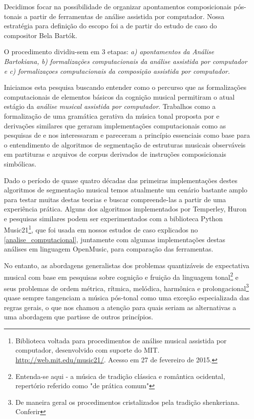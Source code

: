 \documentclass[
	12pt,				%
	openright,			%
	twoside,			%
	a4paper,			%
	english,			%
	french,				%
	spanish,			%
	brazil				%
	]{abntex2}
\begin{document}
Decidimos focar na possibilidade de organizar apontamentos composicionais pós-tonais a partir de ferramentas de análise assistida por computador. Nossa estratégia para definição do escopo foi a de partir do estudo de caso do compositor Bela Bartók.

O procedimento dividiu-sem em 3 etapas:\textit{ a) apontamentos da Análise Bartokiana, b) formalizações computacionais da análise assistida por computador e c) formalizaçoes computacionais da composição assistida por computador.}



Iniciamos esta pesquisa buscando entender como o percurso que as formalizações computacionais de elementos básicos da cognição musical permitiram o atual estágio da \textit{análise musical assistida por computador}. Trabalhos como a formalização de uma gramática gerativa da música tonal proposta por  e derivações similares que geraram implementações computacionais como as pesquisas de  e  nos interessaram e pareceram a princípio essenciais como base para o entendimento de algoritmos de segmentação de estruturas musicais observáveis em partituras e arquivos de corpus derivados de instruções composicionais simbólicas.

Dado o período de quase quatro décadas das primeiras implementações destes algoritmos de segmentação musical temos atualmente um cenário bastante amplo para testar muitas destas teorias e buscar compreende-las a partir de uma experiência prática. Alguns dos algoritmos implementados por Temperley, Huron e pesquisas similares podem ser experimentados com a biblioteca Python Music21\footnote{Biblioteca voltada para procedimentos de análise musical assistida por computador, desenvolvido com suporte do MIT. \url{http://web.mit.edu/music21/}. Acesso em 27 de fevereiro de 2015.}, que foi usada em nossos estudos de caso explicados no \autoref{analise_computacional}, juntamente com algumas implementações destas análises em linguagem OpenMusic, para comparação das ferramentas.

No entanto, as abordagens generalistas dos problemas quantizáveis de expectativa musical com base em pesquisas sobre cognição e fruição da linguagem tonal\footnote{ Entenda-se aqui - a música de tradição clássica e romântica ocidental, repertório referido como "de prática comum"\cite{temperley2001cognition} } e seus problemas de ordem métrica, rítmica, melódica, harmônica e prolongacional\footnote{De maneira geral os procedimentos cristalizados pela tradição shenkeriana. Conferir  } quase sempre tangenciam a música pós-tonal como uma exceção especializada das regras gerais, o que nos chamou a atenção para quais seriam as alternativas a uma abordagem que partisse de outros princípios. 
\end{document}
